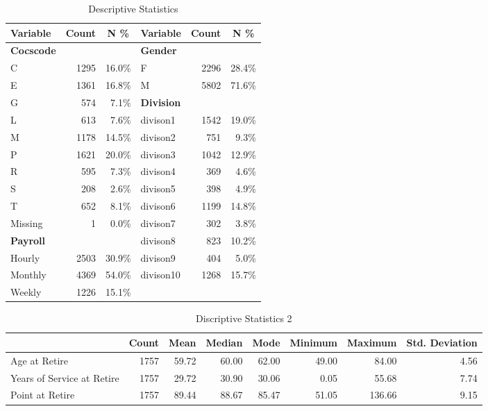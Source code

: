 \documentclass[12pt,letterpaper]{article}
\begin{document}
\begin{table}[htbp]
	\centering
	\scriptsize
		\renewcommand{\arraystretch}{1.5}
	\caption{Descriptive Statistics}
	\begin{tabular}{lrrlrr}
		\toprule
	\textbf{Variable}	& \multicolumn{1}{c}{\textbf{Count}} & \multicolumn{1}{c}{\textbf{N \%}}  &   \textbf{Variable}    & \multicolumn{1}{c}{\textbf{Count}} & \multicolumn{1}{c}{\textbf{N \%}} \\
		\midrule
		\textbf{Cocscode} &       &       & \textbf{Gender} &       &  \\
		C     & 1295  & 16.0\% & F     & 2296  & 28.4\% \\
		E     & 1361  & 16.8\% & M     & 5802  & 71.6\% \\
		G     & 574   & 7.1\% & \textbf{Division} &       &  \\
		L     & 613   & 7.6\% & divison1 & 1542  & 19.0\% \\
		M     & 1178  & 14.5\% & divison2 & 751   & 9.3\% \\
		P     & 1621  & 20.0\% & divison3 & 1042  & 12.9\% \\
		R     & 595   & 7.3\% & divison4 & 369   & 4.6\% \\
		S     & 208   & 2.6\% & divison5 & 398   & 4.9\% \\
		T     & 652   & 8.1\% & divison6 & 1199  & 14.8\% \\
		Missing & 1     & 0.0\% & divison7 & 302   & 3.8\% \\
		\textbf{Payroll} &       &       & divison8 & 823   & 10.2\% \\
		Hourly & 2503  & 30.9\% & divison9 & 404   & 5.0\% \\
		Monthly & 4369  & 54.0\% & divison10 & 1268  & 15.7\% \\
		Weekly & 1226  & 15.1\% &       &       &  \\
		\bottomrule
	\end{tabular}%
	\label{tab:descriptive}%
\end{table}%

\begin{table}[htbp]
	\centering
	\scriptsize
	\caption{Discriptive Statistics 2}
	\begin{tabular}{lrrrrrrr}
		\toprule
		& Count & Mean  & Median & Mode  & Minimum & Maximum & Std. Deviation \\
		\midrule
		\multicolumn{1}{l}{Age at Retire} & 1757  & 59.72 & 60.00 & 62.00 & 49.00 & 84.00 & 4.56 \\
		\multicolumn{1}{l}{Years of Service at Retire} & 1757  & 29.72 & 30.90 & 30.06 & 0.05  & 55.68 & 7.74 \\
		\multicolumn{1}{l}{Point at Retire} & 1757  & 89.44 & 88.67 & 85.47 & 51.05 & 136.66 & 9.15 \\
		\bottomrule
	\end{tabular}%
	\label{tab:descrip2}%
\end{table}%
\end{document}
